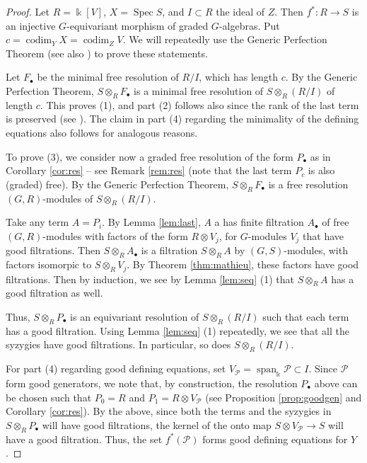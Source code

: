 \documentclass[11pt]{amsart}
\numberwithin{equation}{section}
\theoremstyle{definition}
\DeclareMathOperator{\codim}{codim}
\newcommand{\op}{\operatorname}
\newcommand{\oo}{\otimes}
\newcommand{\mc}{\mathcal}
\newcommand{\kk}{\Bbbk}
\begin{document}
\begin{proof}
Let $R=\kk[V]$, $X=\op{Spec} S$, and $I\subset R$ the ideal of $Z$. Then $f^* : R \to S$ is an injective $G$-equivariant morphism of graded $G$-algebras. Put $c=\codim_Y X = \codim_Z V$. We will repeatedly use the Generic Perfection Theorem \cite{EN} (see also \cite[Theorem 1.2.14]{weymanbook}) to prove these statements.

Let $F_\bullet$ be the minimal free resolution of $R/I$, which has length $c$. By the Generic Perfection Theorem, $S\oo_R F_\bullet$ is a minimal free resolution of $S\oo_R (R/I)$ of length $c$. This proves (1), and part (2) follows also since the rank of the last term is preserved (see \cite[Proposition 1.2.10]{weymanbook}). The claim in part (4) regarding the minimality of the defining equations also follows for analogous reasons.

To prove (3), we consider now a graded free resolution of the form $P_\bullet$ as in Corollary \ref{cor:res} -- see Remark \ref{rem:res} (note that the last term $P_c$ is also (graded) free). By the Generic Perfection Theorem, $S\oo_R F_\bullet$ is a free resolution $(G,R)$-modules of $S\oo_R (R/I)$. 

Take any term $A=P_i$. By Lemma \ref{lem:last}, $A$ a has finite filtration $A_\bullet$ of free $(G,R)$-modules with factors of the form $R\oo V_j$, for $G$-modules $V_j$ that have good filtrations. Then $S \oo_R A_\bullet$ is a filtration $S\oo_R A$ by $(G,S)$-modules, with factors isomorpic to $S\oo_R V_j$. By Theorem \ref{thm:mathieu}, these factors have good filtrations. Then by induction, we see by Lemma \ref{lem:seq} (1) that $S \oo_R A$ has a good filtration as well.

Thus,  $S \oo_R P_\bullet$ is an equivariant resolution of $S\oo_R (R/I)$ such that each term has a good filtration. Using Lemma \ref{lem:seq} (1) repeatedly, we see that all the syzygies have good filtrations. In particular, so does $S\oo_R (R/I)$.

For part (4) regarding good defining equations, set $V_{\mc{P}} = \op{span}_{\kk} \mc{P} \subset I$. Since $\mc{P}$ form good generators, we note that, by construction, the resolution $P_\bullet$ above can be chosen such that $P_0 =R$ and $P_1 = R\oo V_{\mc{P}}$ (see Proposition \ref{prop:goodgen} and Corollary \ref{cor:res}). By the above, since both the terms and the syzygies in  $S \oo_R P_\bullet$ will have good filtrations, the kernel of the onto map $S \oo V_{\mc{P}} \to S$ will have a good filtration. Thus, the set $f^{*}(\mc{P})$ forms good defining equations for $Y$.
\end{proof}
\end{document}
